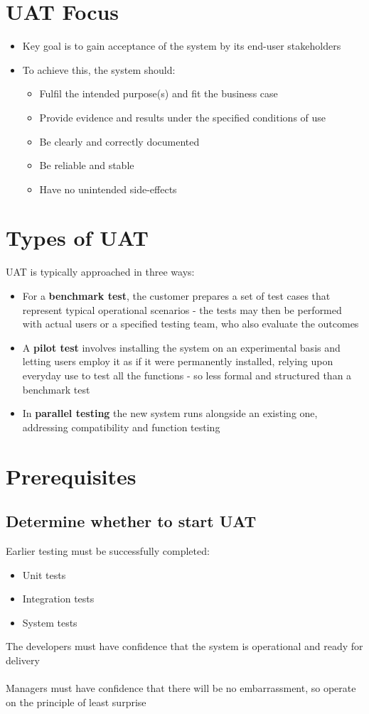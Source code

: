\documentclass{article}[18pt]
\begin{document}
\section{UAT Focus}
\begin{itemize}
	\item Key goal is to gain acceptance of the system by its end-user stakeholders
	\item To achieve this, the system should:
	\begin{itemize}
		\item Fulfil the intended purpose(s) and fit the business case
		\item Provide evidence and results under the specified conditions of use
		\item Be clearly and correctly documented
		\item Be reliable and stable
		\item Have no unintended side-effects
	\end{itemize}
\end{itemize}
\section{Types of UAT}
UAT is typically approached in three ways:
\begin{itemize}
	\item For a \textbf{benchmark test}, the customer prepares a set of test cases that represent typical operational scenarios - the tests may then be performed with actual users or a specified testing team, who also evaluate the outcomes
	\item A \textbf{pilot test} involves installing the system on an experimental basis and letting users employ it as if it were permanently installed, relying upon everyday use to test all the functions - so less formal and structured than a benchmark test
	\item In \textbf{parallel testing} the new system runs alongside an existing one, addressing compatibility and function testing
\end{itemize}
\section{Prerequisites}
\subsection{Determine whether to start UAT}
Earlier testing must be successfully completed:
\begin{itemize}
	\item Unit tests
	\item Integration tests
	\item System tests
\end{itemize}
The developers must have confidence that the system is operational and ready for delivery\\
\\
Managers must have confidence that there will be no embarrassment, so operate on the principle of least surprise
\end{document}
